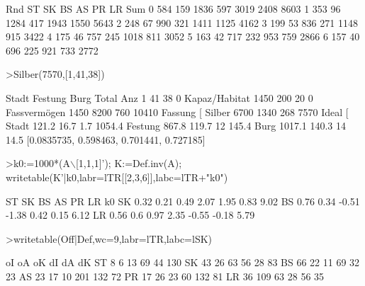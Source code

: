 \documentclass[a4paper,10pt]{article}
\begin{document}
\begin{eulernotebook}
\begin{euleroutput}
       Rnd      ST      SK      BS      AS      PR      LR     Sum
         0     584     159    1836     597    3019    2408    8603
         1     353      96    1284     417    1943    1550    5643
         2     248      67     990     321    1411    1125    4162
         3     199      53     836     271    1148     915    3422
         4     175      46     757     245    1018     811    3052
         5     163      42     717     232     953     759    2866
         6     157      40     696     225     921     733    2772
\end{euleroutput}
\begin{eulerprompt}
>Silber(7570,[1,41,38])
\end{eulerprompt}
\begin{euleroutput}
                       Stadt      Festung         Burg        Total
            Anz            1           41           38            0
  Kapaz/Habitat         1450          200           20            0
   Fassvermögen         1450         8200          760        10410
    Fassung [%
         Silber         6700         1340          268         7570
      Ideal [%
          Stadt        121.2         16.7          1.7       1054.4
        Festung        867.8        119.7           12        145.4
           Burg       1017.1        140.3           14         14.5
  [0.0835735,  0.598463,  0.701441,  0.727185]
\end{euleroutput}
\begin{eulerprompt}
>k0:=1000*(A\(\backslash\)[1,1,1]'); K:=Def.inv(A); writetable(K'|k0,labr=lTR[[2,3,6]],labc=lTR+"k0")
\end{eulerprompt}
\begin{euleroutput}
                    ST        SK        BS        AS        PR        LR        k0
          SK      0.32      0.21      0.49      2.07      1.95      0.83      9.02
          BS      0.76      0.34     -0.51     -1.38      0.42      0.15      6.12
          LR      0.56       0.6      0.97      2.35     -0.55     -0.18      5.79
\end{euleroutput}
\begin{eulerprompt}
>writetable(Off|Def,wc=9,labr=lTR,labc=lSK)
\end{eulerprompt}
\begin{euleroutput}
                  oI       oA       oK       dI       dA       dK
         ST        8        6       13       69       44      130
         SK       43       26       63       56       28       83
         BS       66       22       11       69       32       23
         AS       23       17       10      201      132       72
         PR       17       26       23       60      132       81
         LR       36      109       63       28       56       35
\end{euleroutput}
\end{eulernotebook}
\end{document}
